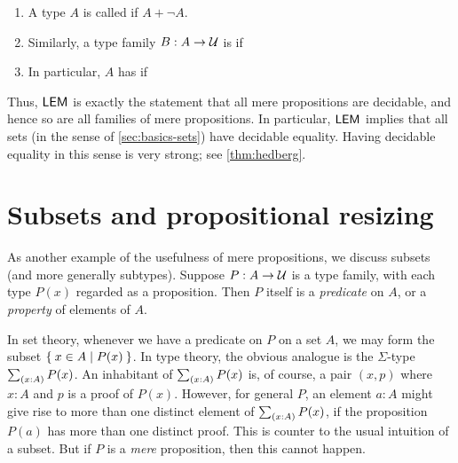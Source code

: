 \begin{defn}\label{defn:decidable-equality}
  \mbox{}
  \begin{enumerate}
  \item A type $A$ is called 
    if $A+\neg A$.
  \item Similarly, a type family $B:A\to \mathcal{U}$ is 
    if 
  \item In particular, $A$ has 
    if 
  \end{enumerate}
\end{defn}

Thus, $\mathsf{LEM}_{}$ is exactly the statement that all mere propositions are decidable, and hence so are all families of mere propositions.
In particular, $\mathsf{LEM}_{}$ implies that all sets (in the sense of \autoref{sec:basics-sets}) have decidable equality.
Having decidable equality in this sense is very strong; see \autoref{thm:hedberg}.

%
%

\section{Subsets and propositional resizing}
\label{subsec:prop-subsets}

%

As another example of the usefulness of mere propositions, we discuss subsets (and more generally subtypes).
Suppose $P:A\to\mathcal{U}$ is a type family, with each type $P(x)$ regarded as a proposition.
Then $P$ itself is a \emph{predicate} on $A$, or a \emph{property} of elements of $A$.

In set theory, whenever we have a predicate on $P$ on a set $A$, we may form the subset $\Set{x\in A | P(x)}$.
In type theory, the obvious analogue is the $\Sigma$-type $\sm{x:A} P(x)$.
An inhabitant of $\sm{x:A} P(x)$ is, of course, a pair $(x,p)$ where $x:A$ and $p$ is a proof of $P(x)$.
However, for general $P$, an element $a:A$ might give rise to more than one distinct element of $\sm{x:A} P(x)$, if the proposition $P(a)$ has more than one distinct proof.
This is counter to the usual intuition of a subset.
But if $P$ is a \emph{mere} proposition, then this cannot happen.


